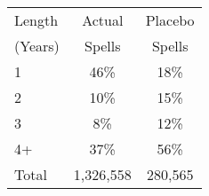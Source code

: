 \begin{tabular}{lcc}
\toprule
Length & Actual & Placebo \\
(Years) & Spells & Spells \\
\midrule
1 & 46\% & 18\% \\
2 & 10\% & 15\% \\
3 & 8\% & 12\% \\
4+ & 37\% & 56\% \\
Total &    1,326,558 &      280,565 \\
\bottomrule
\end{tabular}
